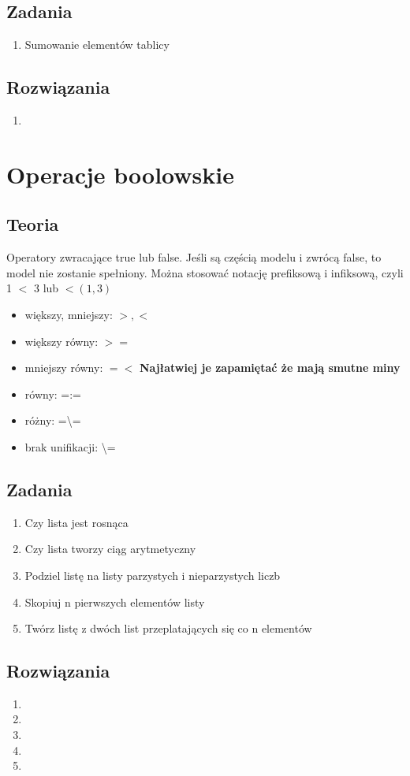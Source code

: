 \documentclass[10pt,a4paper]{article}
\begin{document}
\subsection{Zadania}
\begin{enumerate}
\item Sumowanie elementów tablicy
\end{enumerate}
\subsection{Rozwiązania}
\begin{enumerate}
\item
\end{enumerate}
\section{Operacje boolowskie}
\subsection{Teoria}
Operatory zwracające true lub false. Jeśli są częścią modelu i zwrócą false, to model nie zostanie spełniony.
Można stosować notację prefiksową i infiksową, czyli 1 $<$ 3 lub $<(1,3)$
\begin{itemize}
\item większy, mniejszy: $>, <$
\item większy równy: $>=$
\item mniejszy równy: $=<$ \textbf{Najłatwiej je zapamiętać że mają smutne miny}
\item równy: =:=
\item różny: =\textbackslash=
\item brak unifikacji: \textbackslash=
\end{itemize}
\subsection{Zadania}
\begin{enumerate}
\item Czy lista jest rosnąca
\item Czy lista tworzy ciąg arytmetyczny
\item Podziel listę na listy parzystych i nieparzystych liczb
\item Skopiuj n pierwszych elementów listy
\item Twórz listę z dwóch list przeplatających się co n elementów
\end{enumerate}
\subsection{Rozwiązania}
\begin{enumerate}
\item
\item
\item
\item
\item
\end{enumerate}
\end{document}
